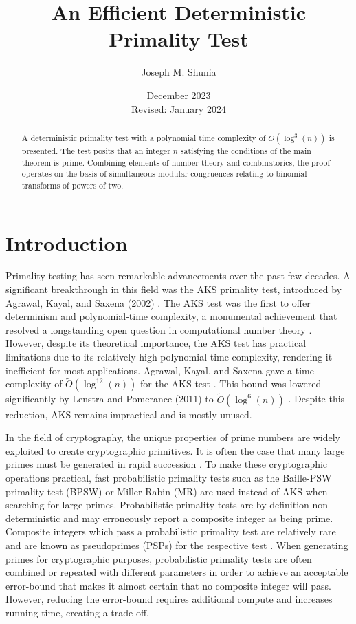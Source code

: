 \documentclass{article}
\title{An Efficient Deterministic Primality Test}
\author{Joseph M. Shunia}
\date{December 2023 \\ \small Revised: January 2024 \normalsize}
\theoremstyle{plain}
\theoremstyle{definition}
\begin{document}
\maketitle

\begin{abstract}
A deterministic primality test with a polynomial time complexity of $\tilde{O}(\log^3(n))$ is presented. The test posits that an integer $n$ satisfying the conditions of the main theorem is prime. Combining elements of number theory and combinatorics, the proof operates on the basis of simultaneous modular congruences relating to binomial transforms of powers of two.
\end{abstract}

\section{Introduction}

Primality testing has seen remarkable advancements over the past few decades. A significant breakthrough in this field was the AKS primality test, introduced by Agrawal, Kayal, and Saxena (2002) \cite{aks2002}. The AKS test was the first to offer determinism and polynomial-time complexity, a monumental achievement that resolved a longstanding open question in computational number theory \cite{goldreich2008}. However, despite its theoretical importance, the AKS test has practical limitations due to its relatively high polynomial time complexity, rendering it inefficient for most applications. Agrawal, Kayal, and Saxena gave a time complexity of $\tilde{O}(\log^{12}(n))$ for the AKS test \cite{aks2002}. This bound was lowered significantly by Lenstra and Pomerance (2011) to $\tilde{O}(\log^6(n))$ \cite{lenstra2011}. Despite this reduction, AKS remains impractical and is mostly unused.

In the field of cryptography, the unique properties of prime numbers are widely exploited to create cryptographic primitives. It is often the case that many large primes must be generated in rapid succession \cite{lenstra1987}. To make these cryptographic operations practical, fast probabilistic primality tests such as the Baille-PSW primality test (BPSW) \cite{baillie1980} or Miller-Rabin (MR) \cite{rabin1980} \cite{miller1976} are used instead of AKS when searching for large primes. Probabilistic primality tests are by definition non-deterministic and may erroneously report a composite integer as being prime. Composite integers which pass a probabilistic primality test are relatively rare and are known as pseudoprimes (PSPs) for the respective test \cite{wagstaff1983}. When generating primes for cryptographic purposes, probabilistic primality tests are often combined or repeated with different parameters in order to achieve an acceptable error-bound that makes it almost certain that no composite integer will pass. However, reducing the error-bound requires additional compute and increases running-time, creating a trade-off.
\end{document}
